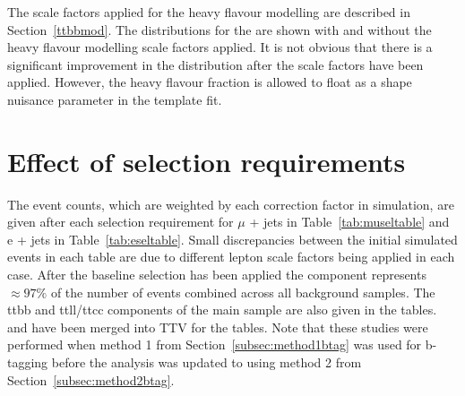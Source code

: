 The scale factors applied for the heavy flavour modelling are described in Section~\ref{ttbbmod}. The distributions for the \nMtags are shown with and without the heavy flavour modelling scale factors applied. It is not obvious that there is a significant improvement in the \nMtags distribution after the scale factors have been applied. However, the heavy flavour fraction is allowed to float as a shape nuisance parameter in the template fit.
\section{Effect of selection requirements \label{cutflow13}}
The event counts, which are weighted by each correction factor in simulation, are given after each selection requirement for $\mu$ + jets in Table~\ref{tab:museltable} and e + jets in Table~\ref{tab:eseltable}.
Small discrepancies between the initial simulated events in each table are due to different lepton scale factors being applied in each case.
After the baseline selection has been applied the \ttbar component represents $\approx 97\%$ of the number of events combined across all background samples. The ttbb and ttll/ttcc components of the main \ttbar sample are also given in the tables. \ttZ and \ttW have been merged into TTV for the tables.
Note that these studies were performed when method 1 from Section~\ref{subsec:method1btag} was used for b-tagging before the analysis was updated to using method 2 from Section~\ref{subsec:method2btag}.

